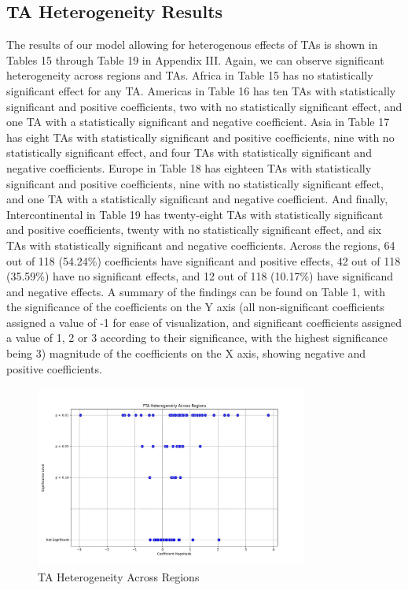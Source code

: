 \subsection{TA Heterogeneity Results}%
\label{subsec:TAHeterogeneityResults}%
The results of our model allowing for heterogenous effects of TAs is
shown in Tables 15 through Table 19 in Appendix III. Again, we can
observe significant heterogeneity across regions and TAs. Africa in
Table 15 has no statistically significant effect for any TA. Americas in
Table 16 has ten TAs with statistically significant and positive
coefficients, two with no statistically significant effect, and one TA
with a statistically significant and negative coefficient. Asia in Table
17 has eight TAs with statistically significant and positive
coefficients, nine with no statistically significant effect, and four
TAs with statistically significant and negative coefficients. Europe in
Table 18 has eighteen TAs with statistically significant and positive
coefficients, nine with no statistically significant effect, and one TA
with a statistically significant and negative coefficient. And finally,
Intercontinental in Table 19 has twenty-eight TAs with statistically
significant and positive coefficients, twenty with no statistically
significant effect, and six TAs with statistically significant and
negative coefficients. Across the regions, 64 out of 118 (54.24\%)
coefficients have significant and positive effects, 42 out of 118
(35.59\%) have no significant effects, and 12 out of 118 (10.17\%) have
significand and negative effects. A summary of the findings can be found
on Table 1, with the significance of the coefficients on the Y axis (all
non-significant coefficients assigned a value of -1 for ease of
visualization, and significant coefficients assigned a value of 1, 2 or
3 according to their significance, with the highest significance being
3) magnitude of the coefficients on the X axis, showing negative and
positive coefficients.
%


\begin{figure}[h!]%
\centering%
\includegraphics[width=0.8\textwidth]{figures/pta_het_vis.jpeg}%
\caption{TA Heterogeneity Across Regions}%
\end{figure}


